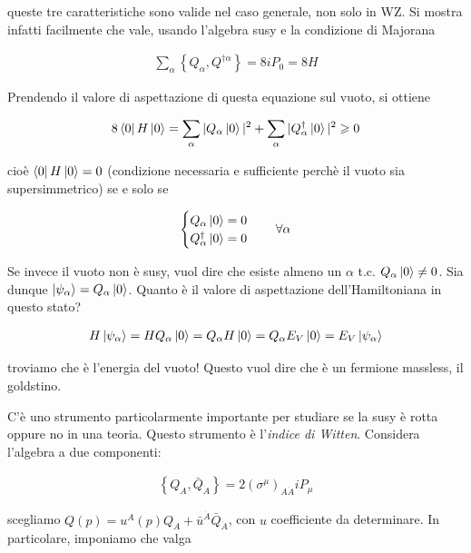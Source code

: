\documentclass{report}
\begin{document}
queste tre caratteristiche sono valide nel caso generale, non solo in WZ. Si mostra infatti facilmente che vale, usando l'algebra susy e la condizione di Majorana

\begin{align}
    \sum_\alpha \left\{ Q_\alpha, Q^{\dagger \alpha} \right\} = 8iP_0 = 8H
\end{align}

Prendendo il valore di aspettazione di questa equazione sul vuoto, si ottiene 

\begin{align}
    8\bra{0}H\ket{0} = \sum_\alpha |Q_\alpha \ket{0}|^2 + \sum_\alpha |Q^\dagger_\alpha \ket{0}|^2 \geqslant 0
\end{align}

cioè \(\bra{0}H\ket{0} =0\) (condizione necessaria e sufficiente perchè il vuoto sia supersimmetrico) se e solo se 

\begin{align}
    \begin{cases}
        Q_\alpha\ket{0} = 0 \\ Q^\dagger_\alpha \ket{0} = 0
    \end{cases} \quad \forall \alpha
\end{align}

Se invece il vuoto non è susy, vuol dire che esiste almeno un \(\alpha\) t.c. \(Q_\alpha \ket{0} \neq 0\). Sia dunque \(\ket{\psi_\alpha} = Q_\alpha \ket{0}\). Quanto è il valore di aspettazione dell'Hamiltoniana in questo stato? 

\begin{align}
    H \ket{\psi_\alpha} = HQ_\alpha \ket{0} = Q_\alpha H \ket{0} = Q_\alpha E_V \ket{0} = E_V \ket{\psi_\alpha}
\end{align}

troviamo che è l'energia del vuoto! Questo vuol dire che è un fermione massless, il goldstino. 

C'è uno strumento particolarmente importante per studiare se la susy è rotta oppure no in una teoria. Questo strumento è l'\emph{indice di Witten}. Considera l'algebra a due componenti: 

\begin{align}
    \left\{ Q_A, \bar{Q}_{\dot{A}} \right\} = 2(\sigma^\mu)_{A\dot{A}} i P_\mu
\end{align}

scegliamo \(Q(p) = u^A(p)Q_A + \bar{u}^{\dot{A}}\bar{Q}_{\dot{A}}\), con \(u\) coefficiente da determinare. In particolare, imponiamo che valga 
\end{document}
